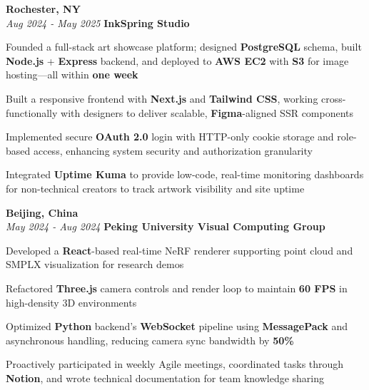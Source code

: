 \begin{twocolentry}{
    \textbf{Rochester, NY} \\
    \textit{Aug 2024 - May 2025}
}{
    \textbf{InkSpring Studio} \\
}
\end{twocolentry}
\begin{onecolentry}
    \begin{highlights}
        \item Founded a full-stack art showcase platform; designed \textbf{PostgreSQL} schema, built \textbf{Node.js} + \textbf{Express} backend, and deployed to \textbf{AWS EC2} with \textbf{S3} for image hosting—all within \textbf{one week}
        \item Built a responsive frontend with \textbf{Next.js} and \textbf{Tailwind CSS}, working cross-functionally with designers to deliver scalable, \textbf{Figma}-aligned SSR components
        \item Implemented secure \textbf{OAuth 2.0} login with HTTP-only cookie storage and role-based access, enhancing system security and authorization granularity
        \item Integrated \textbf{Uptime Kuma} to provide low-code, real-time monitoring dashboards for non-technical creators to track artwork visibility and site uptime
    \end{highlights}
\end{onecolentry}

\vspace{0.2cm}

\begin{twocolentry}{
    \textbf{Beijing, China} \\
    \textit{May 2024 - Aug 2024}
}{
    \textbf{Peking University Visual Computing Group} \\
}
\end{twocolentry}
\begin{onecolentry}
    \begin{highlights}
        \item Developed a \textbf{React}-based real-time NeRF renderer supporting point cloud and SMPLX visualization for research demos
        \item Refactored \textbf{Three.js} camera controls and render loop to maintain \textbf{60 FPS} in high-density 3D environments
        \item Optimized \textbf{Python} backend's \textbf{WebSocket} pipeline using \textbf{MessagePack} and asynchronous handling, reducing camera sync bandwidth by \textbf{50\%}
        \item Proactively participated in weekly Agile meetings, coordinated tasks through \textbf{Notion}, and wrote technical documentation for team knowledge sharing
    \end{highlights}
\end{onecolentry}
